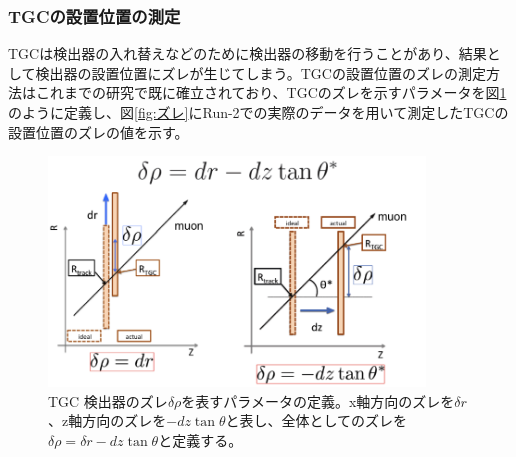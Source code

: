 \subsubsection{TGCの設置位置の測定}
TGCは検出器の入れ替えなどのために検出器の移動を行うことがあり、結果として検出器の設置位置にズレが生じてしまう。TGCの設置位置のズレの測定方法はこれまでの研究で既に確立されており、TGCのズレを示すパラメータを図\ref{fig:dr_para}のように定義し、図\ref{fig:ズレ}にRun-2での実際のデータを用いて測定したTGCの設置位置のズレの値を示す。
\begin{figure}[tb]
  \centering
  \includegraphics[clip, width=10cm]{fig/3/drho_param_position_measurement.png}
  \caption{TGC 検出器のズレ$\delta\rho$を表すパラメータの定義。x軸方向のズレを$\delta r$、z軸方向のズレを$-dz\tan\theta$と表し、全体としてのズレを$\delta\rho = \delta r-dz\tan\theta$と定義する。}
  \label{fig:dr_para}
\end{figure}

